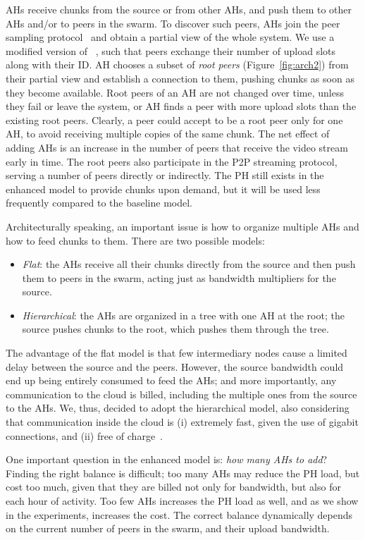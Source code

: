 AHs receive chunks from the source or from other AHs, and push them to other
AHs and/or to peers in the swarm. To discover such peers, AHs join the peer
sampling protocol~\cite{cyclon} and obtain a partial view of the whole system.
We use a modified version of \cyclon~\cite{cyclon}, such that peers exchange
their number of upload slots along with their ID. AH chooses a subset of
\emph{root peers} (Figure~\ref{fig:arch2}) from their partial view and
establish a connection to them, pushing chunks as soon as they become
available. Root peers of an AH are not changed over time, unless they fail or
leave the system, or AH finds a peer with more upload slots than the existing
root peers. Clearly, a peer could accept to be a root peer only for one AH, to
avoid receiving multiple copies of the same chunk. The net effect of adding
AHs is an increase in the number of peers that receive the video stream early
in time. The root peers also participate in the P2P streaming protocol,
serving a number of peers directly or indirectly. The PH still exists in the
enhanced model to provide chunks upon demand, but it will be used less
frequently compared to the baseline model.

Architecturally speaking, an important issue is how to organize multiple AHs
and how to feed chunks to them. There are two possible models:
\begin{itemize}
\item \emph{Flat}: the AHs receive all their chunks directly from the source
and then push them to peers in the swarm, acting just as bandwidth multipliers
for the source.
\item \emph{Hierarchical}: the AHs are organized in a tree with one AH at the
root; the source pushes chunks to the root, which pushes them through the
tree.
\end{itemize}

The advantage of the flat model is that few intermediary nodes cause a limited
delay between the source and the peers. However, the source bandwidth could
end up being entirely consumed to feed the AHs; and more importantly, any
communication to the cloud is billed, including the multiple ones from the
source to the AHs. We, thus, decided to adopt the hierarchical model, also
considering that communication inside the cloud is (i) extremely fast, given
the use of gigabit connections, and (ii) free of
charge~\cite{armbrust2010view}.

One important question in the enhanced model is: \emph{how many AHs to add}?
Finding the right balance is difficult; too many AHs may reduce the PH load,
but cost too much, given that they are billed not only for bandwidth, but 
also for each hour of activity. Too few AHs increases the PH load as well, and as we show in the
experiments, increases the cost. The correct balance dynamically depends on
the current number of peers in the swarm, and their upload bandwidth.

